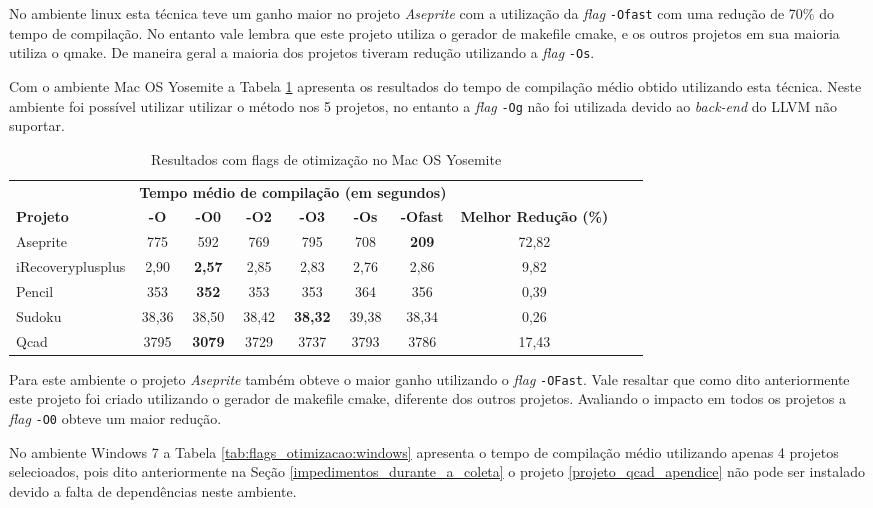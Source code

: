 No ambiente linux esta técnica teve um ganho maior no projeto \textit{Aseprite} com a utilização da \textit{flag} \texttt{-Ofast} com uma redução de 70\%  do tempo de compilação. No entanto vale lembra que este projeto utiliza o gerador de makefile cmake, e os outros projetos em sua maioria utiliza o qmake. De maneira geral a maioria dos projetos tiveram redução utilizando a \textit{flag } \texttt{-Os}.

 Com o ambiente Mac OS Yosemite a Tabela \ref{tab:flags_otimizacao:mac_os} apresenta os resultados do tempo de compilação médio obtido utilizando esta técnica. Neste ambiente foi possível utilizar utilizar o método nos 5 projetos, no entanto a \textit{flag} \texttt{-Og} não foi utilizada devido ao \textit{back-end} do LLVM não suportar.

\begin{table}[!ht]
\tiny
\centering
\caption{Resultados com flags de otimização no Mac OS Yosemite}
\label{tab:flags_otimizacao:mac_os}
\begin{tabular}{lccccccccc}
& \multicolumn{6}{c}{\textbf{Tempo médio de compilação (em segundos)} } \\
 \textbf{Projeto}& \textbf{-O}  & \textbf{-O0}   & \textbf{-O2} & \textbf{-O3} & \textbf{-Os} & \textbf{-Ofast} & \textbf{Melhor Redução (\%)}\\ \toprule
Aseprite            & 775   &  592 &  769   & 795            & 708 & \textbf{209}  & 72,82 \\ 
iRecoveryplusplus   & 2,90  & \textbf{2,57} & 2,85           & 2,83 &  2,76  & 2,86  & 9,82 \\ 
Pencil              & 353   & \textbf{352}  & 353            & 353  & 364 & 356 &  0,39 \\ 
Sudoku              & 38,36 & 38,50 & 38,42 & \textbf{38,32} & 39,38 & 38,34 & 0,26  \\ 
Qcad                & 3795  & \textbf{3079} & 3729           & 3737 & 3793  & 3786 &  17,43  \\ 
\end{tabular}
\end{table}

Para este ambiente o projeto \textit{Aseprite} também obteve o maior ganho 
 utilizando o \textit{flag} \texttt{-OFast}. Vale resaltar que como dito anteriormente este
 projeto foi criado utilizando o gerador de makefile cmake, diferente dos outros projetos.
 Avaliando o impacto em todos os projetos a \textit{flag} \texttt{-O0} obteve um maior redução.


No ambiente Windows 7 a Tabela \ref{tab:flags_otimizacao:windows} apresenta o tempo
 de compilação médio utilizando apenas 4 projetos selecioados, pois dito anteriormente
 na Seção \ref{impedimentos_durante_a_coleta} o projeto \ref{projeto_qcad_apendice} não pode ser instalado
 devido a falta de dependências neste ambiente.

